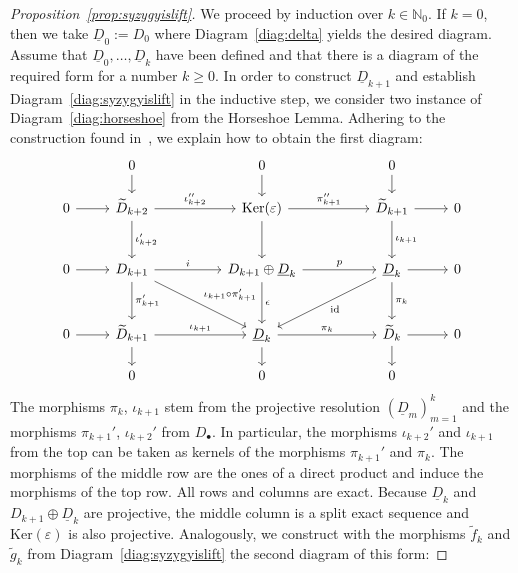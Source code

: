 \documentclass[12pt,a4paper]{article}
\numberwithin{equation}{section}
\theoremstyle{nonumberplain}
\newtheorem{proof}{Proof}
\begin{document}
\begin{proof}[Proposition~\ref{prop:syzygyislift}]
We proceed by induction over $k \in \mathbb{N}_0$. If $k = 0$, then we take $\underline{D}_0 := D_0$ where Diagram~\ref{diag:delta} yields the desired diagram. Assume that $\underline{D}_0, \dots, \underline{D}_k$ have been defined and that there is a diagram of the required form for a number $k \geq 0$. In order to construct $\underline{D}_{k+1}$ and establish Diagram~\ref{diag:syzygyislift} in the inductive step, we consider two instance of Diagram~\ref{diag:horseshoe} from the Horseshoe Lemma. Adhering to the construction found in~\cite[p.~37--38]{wei94}, we explain how to obtain the first diagram:
\begin{equation}\label{diag:horseshoeback}
\begin{tikzcd}[row sep = scriptsize]
  {}
    & 0 \arrow[d]
    & & 0 \arrow[d]
    & & 0 \arrow[d]
    & {} \\
  0 \arrow[r]
    & \widetilde{D}_{k+2} \arrow[rr, "\iota_{k+2}''"] \arrow[dd, "\iota_{k+2}'"]
    & & \mathrm{Ker}(\varepsilon) \arrow[rr, "\pi_{k+1}''"] \arrow[dd]
    & & \widetilde{D}_{k+1} \arrow[r] \arrow[dd, "\iota_{k+1}"]
    & 0 \\ \\
  0 \arrow[r]
    & D_{k+1} \arrow[rr, "i"] \arrow[ddrr, "\iota_{k+1} \circ \pi_{k+1}'"] \arrow[dd, "\pi_{k+1}'"]
    & & D_{k+1} \oplus \underline{D}_k \arrow[rr, "p"] \arrow[dd, "\epsilon"]
    & & \underline{D}_k \arrow[r] \arrow[ddll, "\mathrm{id}"] \arrow[dd, "\pi_k"]
    & 0 \\ \\
  0 \arrow[r]
    & \widetilde{D}_{k+1} \arrow[rr, "\iota_{k+1}"] \arrow[d]
    & & \underline{D}_k \arrow[rr, "\pi_k"] \arrow[d]
    & & \widetilde{D}_k \arrow[r] \arrow[d]
    & 0 \\
  {}
    & 0
    & & 0
    & & 0
    & {}
\end{tikzcd}
\end{equation}
The morphisms $\pi_k$, $\iota_{k+1}$ stem from the projective resolution $(\underline{D}_m)_{m = 1}^k$ and the morphisms $\pi_{k+1}'$, $\iota_{k+2}'$ from $D_{\bullet}$. In particular, the morphisms $\iota_{k+2}'$ and $\iota_{k+1}$ from the top can be taken as kernels of the morphisms $\pi_{k+1}'$ and $\pi_k$. The morphisms of the middle row are the ones of a direct product and induce the morphisms of the top row. All rows and columns are exact. Because $\underline{D}_k$ and $D_{k+1} \oplus \underline{D}_k$ are projective, the middle column is a split exact sequence and $\mathrm{Ker}(\varepsilon)$ is also projective. Analogously, we construct with the morphisms $\widetilde{f}_k$ and $\widetilde{g}_k$ from Diagram~\ref{diag:syzygyislift} the second diagram of this form:

\end{proof}
\end{document}
